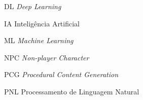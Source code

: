 \begin{siglas}
 \item[DL] \textit{Deep Learning}
 \item[IA] Inteligência Artificial
 \item[ML] \textit{Machine Learning}
 \item[NPC] \textit{Non-player Character}
 \item[PCG] \textit{Procedural Content Generation}
 \item[PNL] Processamento de Linguagem Natural
\end{siglas}
